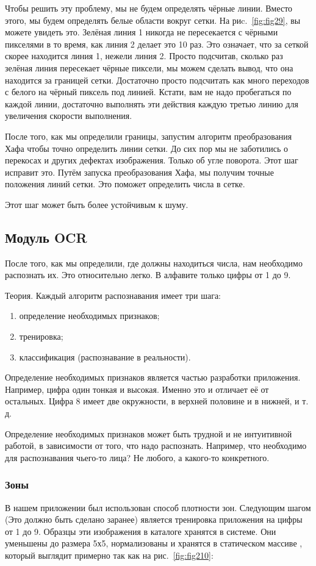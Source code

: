 Чтобы решить эту проблему, мы не будем определять чёрные линии. Вместо этого, мы будем определять белые области вокруг сетки. На  риc.~\ref{fig:fig29}, вы можете увидеть это. Зелёная линия 1 никогда не пересекается с чёрными пикселями в то время, как линия 2 делает это 10 раз. Это означает, что за сеткой скорее находится линия 1, нежели линия 2. Просто подсчитав, сколько раз зелёная линия пересекает чёрные пиксели, мы можем сделать вывод, что она находится за границей сетки. Достаточно просто подсчитать как много переходов с белого на чёрный пиксель под линией. Кстати, вам не надо пробегаться по каждой линии, достаточно выполнять эти действия каждую третью линию для увеличения скорости выполнения.


После того, как мы определили границы, запустим алгоритм преобразования Хафа чтобы точно определить линии сетки. До сих пор мы не заботились о перекосах и других дефектах изображения. Только об угле поворота. Этот шаг исправит это. Путём запуска преобразования Хафа, мы получим точные положения линий сетки. Это поможет определить числа в сетке.

Этот шаг может быть более устойчивым к шуму.

\subsection{Модуль OCR}
После того, как мы определили, где должны находиться числа, нам необходимо распознать их. Это относительно легко. В алфавите только цифры от 1 до 9.

Теория. Каждый алгоритм распознавания имеет три шага:
\begin{enumerate}
  \item определение необходимых признаков;
  \item тренировка;
  \item классификация (распознавание в реальности).
\end{enumerate}

Определение необходимых признаков является частью разработки приложения. Например, цифра один тонкая и высокая. Именно это и отличает её от остальных. Цифра 8 имеет две окружности, в верхней половине и в нижней, и т. д. 

Определение необходимых признаков может быть трудной и не интуитивной работой, в зависимости от того, что надо распознать. Например, что необходимо для распознавания чьего-то лица? Не любого, а какого-то конкретного.

\subsubsection{Зоны}
В нашем приложении был использован способ плотности зон. Следующим шагом (Это должно быть сделано заранее) является тренировка приложения на цифры от 1 до 9. Образцы эти изображения в каталоге хранятся в системе. Они уменьшены до размера 5х5, нормализованы и хранятся в статическом массиве , который выглядит примерно так как на рис.~\ref{fig:fig210}:

